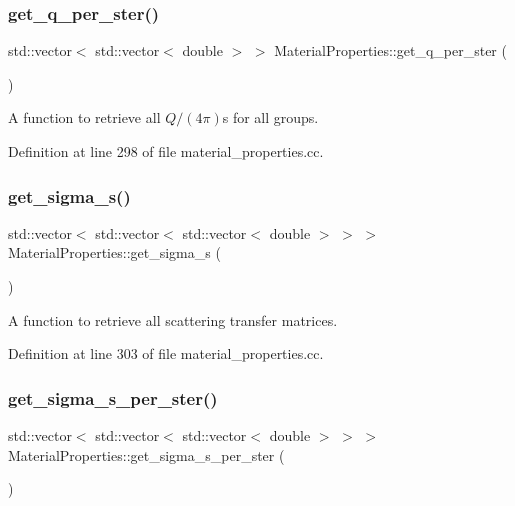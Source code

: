 \subsubsection{\texorpdfstring{get\+\_\+q\+\_\+per\+\_\+ster()}{get\_q\_per\_ster()}}
{\footnotesize\ttfamily std\+::vector$<$ std\+::vector$<$ double $>$ $>$ Material\+Properties\+::get\+\_\+q\+\_\+per\+\_\+ster (\begin{DoxyParamCaption}{ }\end{DoxyParamCaption})}



A function to retrieve all $Q/(4\pi)$\textquotesingle{}s for all groups. 



Definition at line 298 of file material\+\_\+properties.\+cc.

\mbox{\label{class_material_properties_a25c7a9ed0b651758dab132bf627c6269}} 
\subsubsection{\texorpdfstring{get\+\_\+sigma\+\_\+s()}{get\_sigma\_s()}}
{\footnotesize\ttfamily std\+::vector$<$ std\+::vector$<$ std\+::vector$<$ double $>$ $>$ $>$ Material\+Properties\+::get\+\_\+sigma\+\_\+s (\begin{DoxyParamCaption}{ }\end{DoxyParamCaption})}



A function to retrieve all scattering transfer matrices. 



Definition at line 303 of file material\+\_\+properties.\+cc.

\mbox{\label{class_material_properties_a9dbfb1ca140d3b5de3dff2994899182f}} 
\subsubsection{\texorpdfstring{get\+\_\+sigma\+\_\+s\+\_\+per\+\_\+ster()}{get\_sigma\_s\_per\_ster()}}
{\footnotesize\ttfamily std\+::vector$<$ std\+::vector$<$ std\+::vector$<$ double $>$ $>$ $>$ Material\+Properties\+::get\+\_\+sigma\+\_\+s\+\_\+per\+\_\+ster (\begin{DoxyParamCaption}{ }\end{DoxyParamCaption})}



